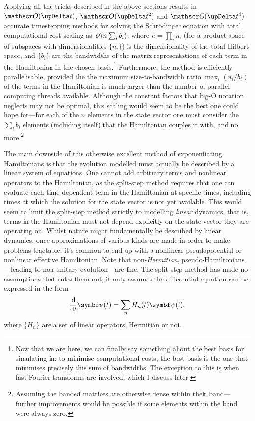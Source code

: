 Applying all the tricks described in the above sections results in $\Ord{\upDelta t}$, $\Ord{\upDelta t^2}$ and $\Ord{\upDelta t^4}$ accurate timestepping methods for solving the Schr\"odinger equation with total computational cost scaling as $\mathscr{O}(n \sum_i b_i)$, where $n=\prod_i n_i$ (for a product space of subspaces with dimensionalities $\{n_i\}$) is the dimensionality of the total Hilbert space, and $\{b_i\}$ are the bandwidths of the matrix representations of each term in the Hamiltonian in the chosen basis.\footnote{Now that we are here, we can finally say something about the best basis for simulating in: to minimise computational costs, the best basis is the one that minimises precisely this sum of bandwidths. The exception to this is when fast Fourier transforms are involved, which I discuss later.} Furthermore, the method is efficiently parallelisable, provided the the maximum size-to-bandwidth ratio $\max_i(n_i/b_i)$ of the terms in the Hamiltonian is much larger than the number of parallel computing threads available. Although the constant factors that big-O notation neglects may not be optimal, this scaling would seem to be the best one could hope for---for each of the $n$ elements in the state vector one must consider the $\sum_i b_i$ elements (including itself) that the Hamiltonian couples it with, and no more.\footnote{Assuming the banded matrices are otherwise dense within their band---further improvements would be possible if some elements within the band were always zero.}

The main downside of this otherwise excellent method of exponentiating Hamiltonians is that the evolution modelled must actually be described by a linear system of equations. One cannot add arbitrary terms and nonlinear operators to the Hamiltonian, as the split-step method requires that one can evaluate each time-dependent term in the Hamiltonian at specific times, including times at which the solution for the state vector is not yet available. This would seem to limit the split-step method strictly to modelling \emph{linear} dynamics, that is, terms in the Hamiltonian must not depend explicitly on the state vector they are operating on. Whilst nature might fundamentally be described by linear dynamics, once approximations of various kinds are made in order to make problems tractable, it's common to end up with a nonlinear pseudopotential or nonlinear effective Hamiltonian. Note that non-\emph{Hermitian}, pseudo-Hamiltonians---leading to non-unitary evolution---are fine. The split-step method has made no assumptions that rules them out, it only assumes the differential equation can be expressed in the form
\begin{align}
\dv t \vec\psi(t) = \sum_n H_n(t)\vec\psi(t),
\end{align}
where $\{H_n\}$ are a set of linear operators, Hermitian or not.

